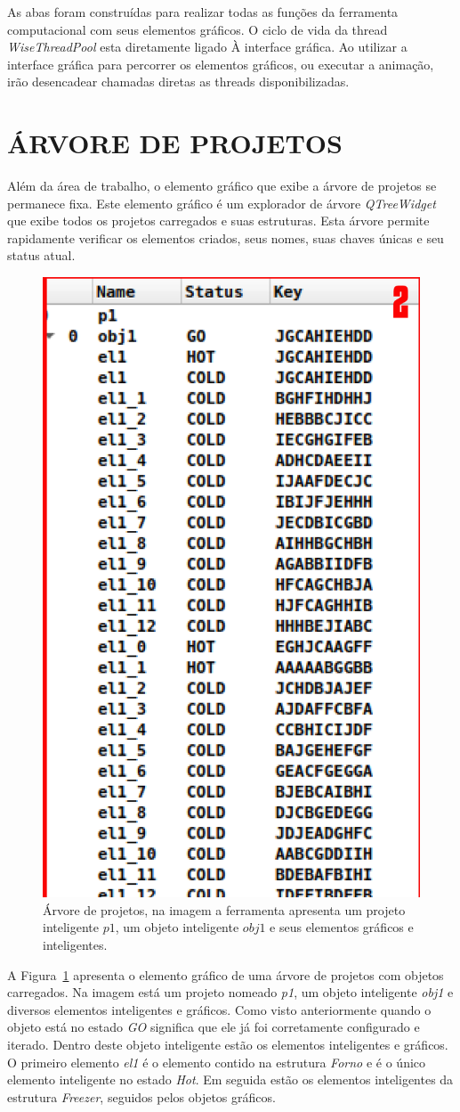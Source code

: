\documentclass[a4paper,12pt]{monografia}
\theoremstyle{plain}
\theoremstyle{definition}
\theoremstyle{remark}
\begin{document}
As abas foram construídas para realizar todas as funções da ferramenta computacional com seus elementos gráficos. O ciclo de vida da thread \textit{WiseThreadPool} esta diretamente ligado À interface gráfica. Ao utilizar a interface gráfica para percorrer os elementos gráficos, ou executar a animação, irão desencadear chamadas diretas as threads disponibilizadas.

\section{ÁRVORE DE PROJETOS}\label{sec:arvore_projetos}

Além da área de trabalho, o elemento gráfico que exibe a árvore de projetos se permanece fixa. Este elemento gráfico é um explorador de árvore \textit{QTreeWidget} que exibe todos os projetos carregados e suas estruturas. Esta árvore permite rapidamente verificar os elementos criados, seus nomes, suas chaves únicas e seu status atual.

\begin{figure}[!htbp]
	\centering
	\includegraphics[width=0.4\linewidth]{Figures/IGU_001c.png}
	\caption{Árvore de projetos, na imagem a ferramenta apresenta um projeto inteligente $p1$, um objeto inteligente $obj1$ e seus elementos gráficos e inteligentes.}
	\label{fig:arvores}
\end{figure}

A Figura~\ref{fig:arvores} apresenta o elemento gráfico de uma árvore de projetos com objetos carregados. Na imagem está um projeto nomeado \textit{p1}, um objeto inteligente \textit{obj1} e diversos elementos inteligentes e gráficos. Como visto anteriormente quando o objeto está no estado \textit{GO} significa que ele já foi corretamente configurado e iterado. Dentro deste objeto inteligente estão os elementos inteligentes e gráficos. O primeiro elemento \textit{el1} é o elemento contido na estrutura \textit{Forno} e é o único elemento inteligente no estado \textit{Hot}. Em seguida estão os elementos inteligentes da estrutura \textit{Freezer}, seguidos pelos objetos gráficos.
\end{document}
